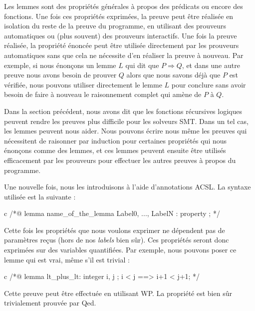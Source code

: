 
Les lemmes sont des propriétés générales à propos des prédicats ou encore des 
fonctions. Une fois ces propriétés exprimées, la preuve peut être réalisée en
isolation du reste de la preuve du programme, en utilisant des prouveurs 
automatiques ou (plus souvent) des prouveurs interactifs. Une fois la preuve
réalisée, la propriété énoncée peut être utilisée directement par les prouveurs
automatiques sans que cela ne nécessite d'en réaliser la preuve à nouveau. Par
exemple, si nous énonçons un lemme $L$ qui dit que $P \Rightarrow Q$, et dans
une autre preuve nous avons besoin de prouver $Q$ alors que nous savons déjà
que $P$ est vérifiée, nous pouvons utiliser directement le lemme $L$ pour
conclure sans avoir besoin de faire à nouveau le raisonnement complet qui
amène de $P$ à $Q$.



Dans la section précédent, nous avons dit que les fonctions récursives logiques
peuvent rendre les preuves plus difficile pour les solveurs SMT. Dans un tel cas,
les lemmes peuvent nous aider. Nous pouvons écrire nous même les preuves qui 
nécessitent de raisonner par induction pour certaines propriétés qui nous
énonçons comme des lemmes, et ces lemmes peuvent ensuite être utilisés 
efficacement par les prouveurs pour effectuer les autres preuves à propos du
programme.




Une nouvelle fois, nous les introduisons à l'aide d'annotations ACSL. La syntaxe
utilisée est la suivante :



\begin{CodeBlock}{c}
/*@
  lemma name_of_the_lemma { Label0, ..., LabelN }:
    property ;
*/
\end{CodeBlock}



Cette fois les propriétés que nous voulons exprimer ne dépendent pas de 
paramètres reçus (hors de nos \textit{labels} bien sûr). Ces propriétés seront donc 
exprimées sur des variables quantifiées. Par exemple, nous pouvons poser ce 
lemme qui est vrai, même s'il est trivial :



\begin{CodeBlock}{c}
/*@
  lemma lt_plus_lt:
    \forall integer i, j ; i < j ==> i+1 < j+1;
*/
\end{CodeBlock}



Cette preuve peut être effectuée en utilisant WP. La propriété est bien sûr 
trivialement prouvée par Qed.



